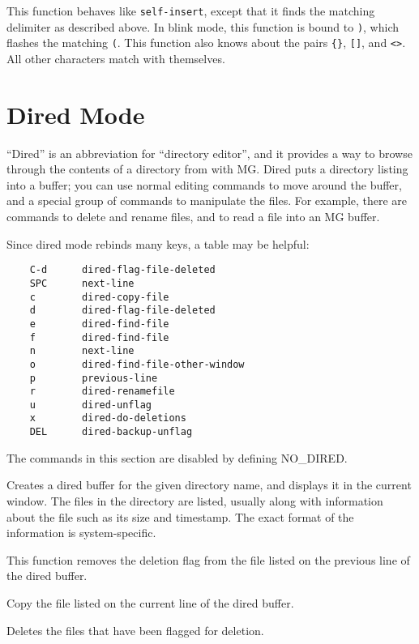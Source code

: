 \fbody This function behaves like {\tt self-insert}, except that it
finds the matching delimiter as described above.  In blink mode, this
function is bound to \verb")", which flashes the matching \verb"(".  This
function also knows about the pairs \verb"{}", \verb"[]", and \verb"<>".
All other characters match with themselves.

\section{Dired Mode}

``Dired'' is an abbreviation for ``directory editor'', and it provides a way
to browse through the contents of a directory from with MG.  Dired puts
a directory listing into a buffer; you can use normal editing commands to
move around the buffer, and a special group of commands to manipulate
the files.  For example, there are commands to delete and rename files,
and to read a file into an MG buffer.

Since dired mode rebinds many keys, a table may be helpful:

\begin{verbatim}
    C-d      dired-flag-file-deleted
    SPC      next-line
    c        dired-copy-file
    d        dired-flag-file-deleted
    e        dired-find-file
    f        dired-find-file
    n        next-line
    o        dired-find-file-other-window
    p        previous-line
    r        dired-renamefile
    u        dired-unflag
    x        dired-do-deletions
    DEL      dired-backup-unflag
\end{verbatim}

The commands in this section are disabled by defining NO\_DIRED.

\fbody Creates a dired buffer for the given directory name, and displays
it in the current window.  The files
in the directory are listed, usually along with information about the
file such as its size and timestamp.  The exact format of the information
is system-specific.

\fbody This function removes the deletion flag from the file listed on
the previous line of the dired buffer.

\fbody Copy the file listed on the current line of the dired buffer.

\fbody Deletes the files that have been flagged for deletion.


